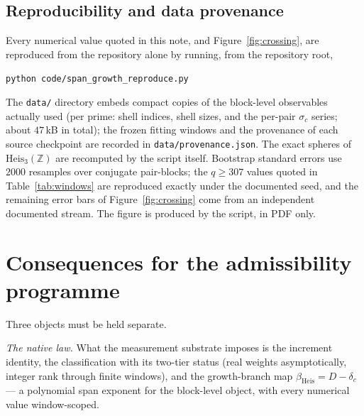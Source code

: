 \documentclass[11pt,a4paper]{article}
\theoremstyle{definition}
\newcommand{\Heis}{\mathrm{Heis}_3(\mathbb{Z})}
\newcommand{\dc}{\delta_c}
\begin{document}
\subsection{Reproducibility and data provenance}
\label{ssec:repro}

Every numerical value quoted in this note, and Figure~\ref{fig:crossing}, are reproduced from the
repository alone by running, from the repository root,
\begin{center}
  \texttt{python code/span\_growth\_reproduce.py}
\end{center}
The \texttt{data/} directory embeds compact copies of the block-level observables actually used (per prime:
shell indices, shell sizes, and the per-pair $\sigma_c$ series; about $47$\,kB in total); the frozen fitting
windows and the provenance of each source checkpoint are recorded in \texttt{data/provenance.json}.
The exact spheres of $\Heis$ are recomputed by the script itself.
Bootstrap standard errors use $2000$ resamples over conjugate pair-blocks; the $q \ge 307$ values quoted in
Table~\ref{tab:windows} are reproduced exactly under the documented seed, and the remaining error bars of
Figure~\ref{fig:crossing} come from an independent documented stream.
The figure is produced by the script, in PDF only.

\section{Consequences for the admissibility programme}
\label{sec:consequences}

Three objects must be held separate.

\emph{The native law.}
What the measurement substrate imposes is the increment identity, the classification with its two-tier
status (real weights asymptotically, integer rank through finite windows), and the growth-branch map
$\beta_{\mathrm{Heis}} = D - \dc$ --- a polynomial span exponent for the block-level object, with every
numerical value window-scoped.
\end{document}
